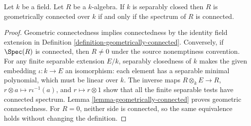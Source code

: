 \begin{lemma}
\label{lemma-separably-closed-connected-implies-geometric}
Let $k$ be a field.
Let $R$ be a $k$-algebra.
If $k$ is separably closed then $R$ is
geometrically connected over $k$ if and only if the
spectrum of $R$ is connected.
\end{lemma}

\begin{proof}
Geometric connectedness implies
connectedness by the identity field
extension in Definition
\ref{definition-geometrically-connected}.
Conversely, if $\Spec(R)$ is
connected, then $R\neq0$ under
the source nonemptiness convention.
For any finite separable extension
$E/k$, separably closedness of $k$
makes the given embedding $\iota:k\to E$
an isomorphism: each element has
a separable minimal polynomial,
which must be linear over $k$.
The inverse maps
$R\otimes_k E\to R$, $r\otimes a\mapsto r\iota^{-1}(a)$,
and $r\mapsto r\otimes1$ show
that all the finite separable
tests have connected spectrum.
Lemma \ref{lemma-geometrically-connected}
proves geometric connectedness.
For $R=0$, neither side is
connected, so the same equivalence
holds without changing the definition.
\end{proof}